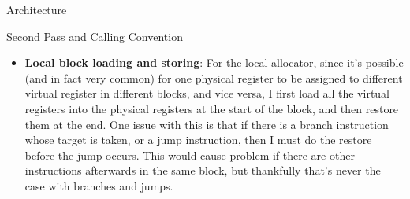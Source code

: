 \documentclass[letterpaper,12pt]{article}
\theoremstyle{definition}
\begin{document}
\begin{section}{Architecture}
\begin{subsection}{Second Pass and Calling Convention}
\begin{itemize}
\begin{enumerate}
                        \item restore \$t1 old value
                    \end{enumerate}
                    As one can see, this is grossly inefficent, and not everything is actually needed. In particular, if there is nothing mapped to these temp registers (as is the case when I spill or for higher registers), there is no need to store and restore their values. Similarly, since $b$ is not being written to here, its value needs only be loaded but not stored. There is an optimize flag that can be used to perform these optimization
                \item \textbf{Local block loading and storing}: For the local allocator, since it's possible (and in fact very common) for one physical register to be assigned to different virtual register in different blocks, and vice versa, I first load all the virtual registers into the physical registers at the start of the block, and then restore them at the end. One issue with this is that if there is a branch instruction whose target is taken, or a jump instruction, then I must do the restore before the jump occurs. This would cause problem if there are other instructions afterwards in the same block, but thankfully that's never the case with branches and jumps.
            \end{itemize}
        \end{subsection}
    \end{section}
\end{document}
